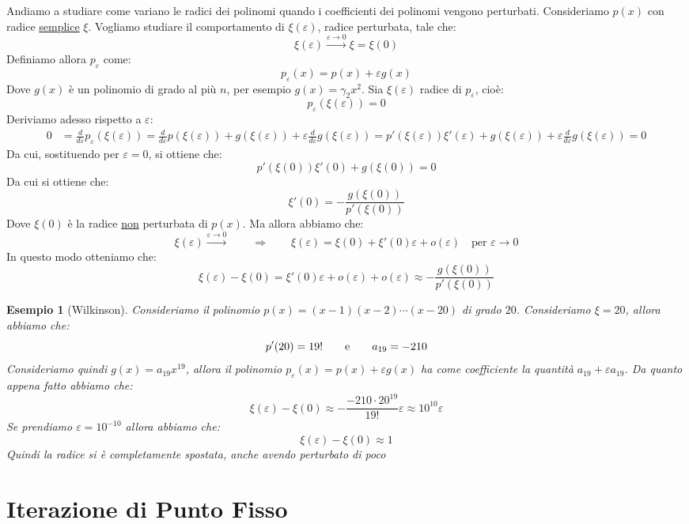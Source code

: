 \documentclass[11pt,a4paper,twoside]{article}
\newcommand{\vareps}{\varepsilon}
\newtheorem{es}{Esempio}
\theoremstyle{definition}
\begin{document}
Andiamo a studiare come variano le radici dei polinomi quando i coefficienti dei polinomi vengono perturbati. Consideriamo $p(x)$ con radice \underline{semplice} $\xi$. Vogliamo studiare il comportamento di $\xi(\vareps)$, radice perturbata, tale che:
\[ \xi(\vareps) \xrightarrow{\vareps \to 0} \xi = \xi(0) \]
Definiamo allora $p_\vareps$ come:
\[ p_\vareps(x) = p(x) + \vareps g(x) \]
Dove $g(x)$ è un polinomio di grado al più $n$, per esempio $g(x) = \gamma_2 x^2$. Sia $\xi(\vareps)$ radice di $p_\vareps$, cioè:
\[ p_\vareps (\xi(\vareps))=0 \]
Deriviamo adesso rispetto a $\vareps$:
\begin{align*}
	0 &= \frac{d}{d\vareps}p_\vareps(\xi(\vareps)) = \frac{d}{d\vareps} p(\xi(\vareps)) + g(\xi(\vareps)) + \vareps \frac d{d\vareps} g(\xi(\vareps)) = p'(\xi(\vareps))\xi'(\vareps) + g(\xi(\vareps)) + \vareps \frac d{d\vareps}g(\xi(\vareps)) = 0
\end{align*}
Da cui, sostituendo per $\vareps = 0$, si ottiene che:
\[ p'(\xi(0)) \xi'(0) + g(\xi(0)) = 0 \]
Da cui si ottiene che:
\[ \xi'(0) = - \frac{g(\xi(0))}{p'(\xi(0))} \]
Dove $\xi(0)$ è la radice \underline{non} perturbata di $p(x)$. Ma allora abbiamo che:
\[ \xi(\vareps) \xrightarrow{\vareps \to 0} \qquad \Rightarrow \qquad \xi(\vareps) = \xi(0) + \xi'(0)\vareps + o(\vareps) \quad \text{per }\vareps \to 0 \]
In questo modo otteniamo che:
\[ \xi(\vareps) - \xi(0)= \xi'(0)\vareps+ o(\vareps) + o(\vareps) \approx - \frac{g(\xi(0))}{p'(\xi(0))} \]

\begin{es}[Wilkinson]
	Consideriamo il polinomio $p(x) = (x-1)(x-2)\cdots(x-20)$ di grado $20$. Consideriamo $\xi = 20$, allora abbiamo che:
	\[ p'(20) = 19! \qquad \text e \qquad a_{19} = -210 \]
	Consideriamo quindi $g(x) = a_{19} x^{19}$, allora il polinomio $p_\vareps(x) = p(x) + \vareps g(x)$ ha come coefficiente la quantità $a_{19} + \vareps a_{19}$. Da quanto appena fatto abbiamo che:
	\[ \xi(\vareps) - \xi(0) \approx - \frac{-210 \cdot 20^{19}}{19!} \vareps \approx 10^{10} \vareps \]
	Se prendiamo $\vareps = 10^{-10}$ allora abbiamo che:
	\[ \xi(\vareps) - \xi(0) \approx 1 \]
	Quindi la radice si è completamente spostata, anche avendo perturbato di poco
\end{es}

\newpage

\section{Iterazione di Punto Fisso}
\end{document}
